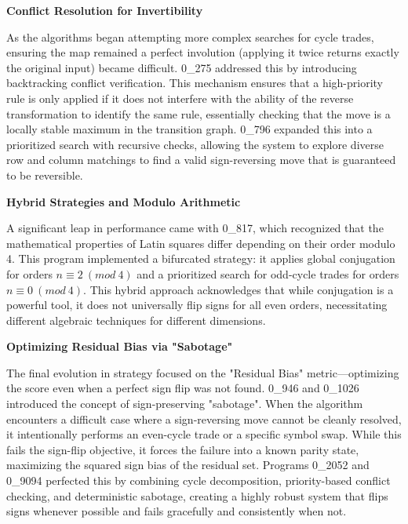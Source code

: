 \documentclass[11pt]{amsart}
\begin{document}
\begin{tcolorbox}[
  enhanced,
  breakable,
  title={Gemini-generated summary},
  colback=gray!3,
  colframe=black!30,
  title after break={Gemini-generated summary (continued)}
]
\noindent \textbf{Conflict Resolution for Invertibility}

As the algorithms began attempting more complex searches for cycle trades, ensuring the map remained a perfect involution (applying it twice returns exactly the original input) became difficult. 0\_275 addressed this by introducing backtracking conflict verification. This mechanism ensures that a high-priority rule is only applied if it does not interfere with the ability of the reverse transformation to identify the same rule, essentially checking that the move is a locally stable maximum in the transition graph. 0\_796 expanded this into a prioritized search with recursive checks, allowing the system to explore diverse row and column matchings to find a valid sign-reversing move that is guaranteed to be reversible.

\noindent \textbf{Hybrid Strategies and Modulo Arithmetic}

A significant leap in performance came with 0\_817, which recognized that the mathematical properties of Latin squares differ depending on their order modulo 4. This program implemented a bifurcated strategy: it applies global conjugation for orders $n \equiv 2\ (mod\ 4)$ and a prioritized search for odd-cycle trades for orders $n \equiv 0\ (mod\ 4)$. This hybrid approach acknowledges that while conjugation is a powerful tool, it does not universally flip signs for all even orders, necessitating different algebraic techniques for different dimensions.

\noindent \textbf{Optimizing Residual Bias via "Sabotage"}

The final evolution in strategy focused on the "Residual Bias" metric—optimizing the score even when a perfect sign flip was not found. 0\_946 and 0\_1026 introduced the concept of sign-preserving "sabotage". When the algorithm encounters a difficult case where a sign-reversing move cannot be cleanly resolved, it intentionally performs an even-cycle trade or a specific symbol swap. While this fails the sign-flip objective, it forces the failure into a known parity state, maximizing the squared sign bias of the residual set. Programs 0\_2052 and 0\_9094 perfected this by combining cycle decomposition, priority-based conflict checking, and deterministic sabotage, creating a highly robust system that flips signs whenever possible and fails gracefully and consistently when not.
\end{tcolorbox}
\end{document}
